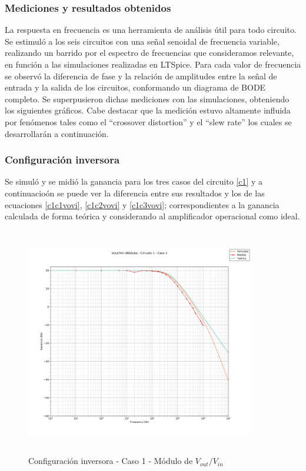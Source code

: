 \subsubsection{Mediciones y resultados obtenidos} %

La respuesta en frecuencia es una herramienta de análisis útil para todo circuito. Se estimuló a los seis circuitos con una se\~nal senoidal de frecuencia variable, realizando un barrido por el espectro de frecuencias que consideramos relevante, en función a las simulaciones realizadas en LTSpice. Para cada valor de frecuencia se observó la diferencia de fase y la relación de amplitudes entre la se\~nal de entrada y la salida de los circuitos, conformando un diagrama de BODE completo. Se superpusieron dichas mediciones con las simulaciones, obteniendo los siguientes gráficos.
Cabe destacar que la medición estuvo altamente influida por fenómenos tales como el “crossover distortion” y el “slew rate” los cuales se desarrollarán a continuación.
\subsubsection*{Configuraci\'on inversora}
Se simul\'o y se midi\'o la ganancia para los tres casos del circuito \ref{c1} 
y a continuacio\'on se puede ver la diferencia entre sus resultados y los 
de las ecuaciones \ref{c1c1vovi}, \ref{c1c2vovi} y \ref{c1c3vovi}; correspondientes a 
la ganancia calculada de forma te\'orica y considerando al amplificador operacional como ideal.


\begin{figure}[H] %
	\centering
	\includegraphics[width=10cm,height=10cm,keepaspectratio]{../EJ1/00GRAFICOS/c1c1/c1c1voviMod.png}
	\caption{Configuración inversora -  Caso 1 - Módulo de $V_{out}/V_{in}$}
	\label{c1c1voviM}
\end{figure}

